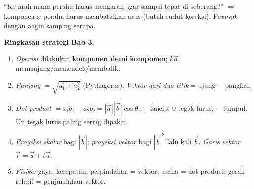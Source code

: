 \begin{variasi}
``Ke arah mana perahu harus mengarah agar sampai tepat di seberang?''
$\Rightarrow$ komponen $x$ perahu harus membatalkan arus (butuh sudut koreksi).
Pesawat dengan angin samping serupa.
\end{variasi}

\begin{tips}
\textbf{Ringkasan strategi Bab 3.}
\begin{enumerate}[leftmargin=*,topsep=2pt]
  \item \emph{Operasi} dilakukan \textbf{komponen demi komponen}; $k\vec a$
  memanjang/memendek/membalik.
  \item \emph{Panjang} $=\sqrt{a_1^2+a_2^2}$ (Pythagoras). \emph{Vektor dari
  dua titik} = ujung $-$ pangkal.
  \item \emph{Dot product} $=a_1b_1+a_2b_2=|\vec a||\vec b|\cos\theta$: $+$
  lancip, $0$ tegak lurus, $-$ tumpul. Uji tegak lurus paling sering dipakai.
  \item \emph{Proyeksi skalar} bagi $|\vec b|$; \emph{proyeksi vektor} bagi
  $|\vec b|^2$ lalu kali $\vec b$. \emph{Garis vektor} $\vec r=\vec a+t\vec u$.
  \item \emph{Fisika:} gaya, kecepatan, perpindahan = vektor; usaha = dot
  product; gerak relatif = penjumlahan vektor.
\end{enumerate}
\end{tips}


